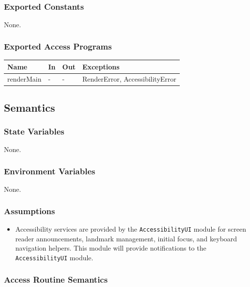 \documentclass[12pt, titlepage]{article}
\begin{document}
\subsubsection{Exported Constants}
None.

\subsubsection{Exported Access Programs}

\begin{center}
  \begin{tabular}{p{2.5cm} p{4cm} p{4cm} p{3cm}}
    \hline
    \textbf{Name} & \textbf{In} & \textbf{Out} & \textbf{Exceptions} \\
    \hline
    renderMain & - & - & RenderError, AccessibilityError \\
    \hline
  \end{tabular}
\end{center}

\subsection{Semantics}

\subsubsection{State Variables}

None.

\subsubsection{Environment Variables}

None. 

\subsubsection{Assumptions}

\begin{itemize}
  \item Accessibility services are provided by the
    \texttt{AccessibilityUI} module for screen reader announcements,
    landmark management, initial focus, and keyboard navigation
    helpers. This module will provide notifications to
    the \texttt{AccessibilityUI} module.
\end{itemize}
\subsubsection{Access Routine Semantics}
\end{document}
